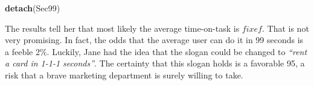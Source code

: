 \documentclass[]{svmono}
\newenvironment{Shaded}{\begin{snugshade}}{\end{snugshade}}
\newcommand{\KeywordTok}[1]{\textcolor[rgb]{0.13,0.29,0.53}{\textbf{#1}}}
\newcommand{\DataTypeTok}[1]{\textcolor[rgb]{0.13,0.29,0.53}{#1}}
\newcommand{\DecValTok}[1]{\textcolor[rgb]{0.00,0.00,0.81}{#1}}
\newcommand{\StringTok}[1]{\textcolor[rgb]{0.31,0.60,0.02}{#1}}
\newcommand{\OperatorTok}[1]{\textcolor[rgb]{0.81,0.36,0.00}{\textbf{#1}}}
\newcommand{\NormalTok}[1]{#1}
\begin{document}
\begin{Shaded}
\end{Shaded}

\begin{Shaded}
\begin{Highlighting}[]
\KeywordTok{detach}\NormalTok{(Sec99)}
\end{Highlighting}
\end{Shaded}

The results tell her that most likely the average time-on-task is
\(fixef\). That is not very promising. In fact, the odds that the
average user can do it in 99 seconds is a feeble 2\%. Luckily, Jane had
the idea that the slogan could be changed to \emph{``rent a card in
1-1-1 seconds''}. The certainty that this slogan holds is a favorable
95, a risk that a brave marketing department is surely willing to take.
\end{document}
